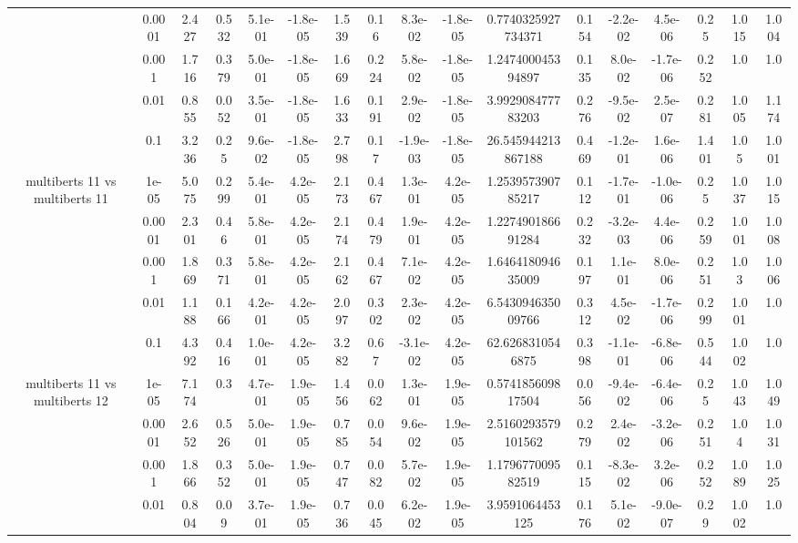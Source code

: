 \begin{tabular}{|c|c|c|c|c|c|c|c|c|c|c|c|c|c|c|c|c|}
 & 0.0001 & 2.427 & 0.532 & 5.1e-01 & -1.8e-05 & 1.539 & 0.16 & 8.3e-02 & -1.8e-05 & 0.7740325927734371 & 0.154 & -2.2e-02 & 4.5e-06 & 0.25 & 1.015 & 1.004 \\
 & 0.001 & 1.716 & 0.379 & 5.0e-01 & -1.8e-05 & 1.669 & 0.224 & 5.8e-02 & -1.8e-05 & 1.247400045394897 & 0.135 & 8.0e-02 & -1.7e-06 & 0.252 & 1.0 & 1.0 \\
 & 0.01 & 0.855 & 0.052 & 3.5e-01 & -1.8e-05 & 1.633 & 0.191 & 2.9e-02 & -1.8e-05 & 3.992908477783203 & 0.276 & -9.5e-02 & 2.5e-07 & 0.281 & 1.005 & 1.174 \\
 & 0.1 & 3.236 & 0.25 & 9.6e-02 & -1.8e-05 & 2.798 & 0.17 & -1.9e-03 & -1.8e-05 & 26.545944213867188 & 0.469 & -1.2e-01 & 1.6e-06 & 1.401 & 1.05 & 1.001 \\
\hline
\multirow{5}{*}{multiberts 11 vs multiberts 11} & 1e-05 & 5.075 & 0.299 & 5.4e-01 & 4.2e-05 & 2.173 & 0.467 & 1.3e-01 & 4.2e-05 & 1.253957390785217 & 0.112 & -1.7e-01 & -1.0e-06 & 0.25 & 1.037 & 1.015 \\
 & 0.0001 & 2.301 & 0.46 & 5.8e-01 & 4.2e-05 & 2.174 & 0.479 & 1.9e-01 & 4.2e-05 & 1.227490186691284 & 0.232 & -3.2e-03 & 4.4e-06 & 0.259 & 1.001 & 1.008 \\
 & 0.001 & 1.869 & 0.371 & 5.8e-01 & 4.2e-05 & 2.162 & 0.467 & 7.1e-02 & 4.2e-05 & 1.646418094635009 & 0.197 & 1.1e-01 & 8.0e-06 & 0.251 & 1.03 & 1.006 \\
 & 0.01 & 1.188 & 0.166 & 4.2e-01 & 4.2e-05 & 2.097 & 0.302 & 2.3e-02 & 4.2e-05 & 6.543094635009766 & 0.312 & 4.5e-02 & -1.7e-06 & 0.299 & 1.001 & 1.0 \\
 & 0.1 & 4.392 & 0.416 & 1.0e-01 & 4.2e-05 & 3.282 & 0.67 & -3.1e-02 & 4.2e-05 & 62.6268310546875 & 0.398 & -1.1e-01 & -6.8e-06 & 0.544 & 1.002 & 1.0 \\
\hline
\multirow{5}{*}{multiberts 11 vs multiberts 12} & 1e-05 & 7.174 & 0.3 & 4.7e-01 & 1.9e-05 & 1.456 & 0.062 & 1.3e-01 & 1.9e-05 & 0.574185609817504 & 0.056 & -9.4e-02 & -6.4e-06 & 0.25 & 1.043 & 1.049 \\
 & 0.0001 & 2.652 & 0.526 & 5.0e-01 & 1.9e-05 & 0.785 & 0.054 & 9.6e-02 & 1.9e-05 & 2.5160293579101562 & 0.279 & 2.4e-02 & -3.2e-06 & 0.251 & 1.04 & 1.031 \\
 & 0.001 & 1.866 & 0.352 & 5.0e-01 & 1.9e-05 & 0.747 & 0.082 & 5.7e-02 & 1.9e-05 & 1.179677009582519 & 0.115 & -8.3e-02 & 3.2e-06 & 0.252 & 1.089 & 1.025 \\
 & 0.01 & 0.804 & 0.09 & 3.7e-01 & 1.9e-05 & 0.736 & 0.045 & 6.2e-02 & 1.9e-05 & 3.9591064453125 & 0.176 & 5.1e-02 & -9.0e-07 & 0.29 & 1.002 & 1.0 \\

\end{tabular}
